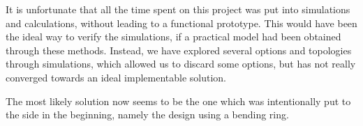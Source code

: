 \asterbreak

It is unfortunate that all the time spent on this project was put into
simulations and calculations, without leading to a functional prototype. This
would have been the ideal way to verify the simulations, if a practical model
had been obtained through these methods. Instead, we have explored several
options and topologies through simulations, which allowed us to discard some
options, but has not really converged towards an ideal implementable solution. 

The most likely solution now seems to be the one which was intentionally put to
the side in the beginning, namely the design using a bending ring.



